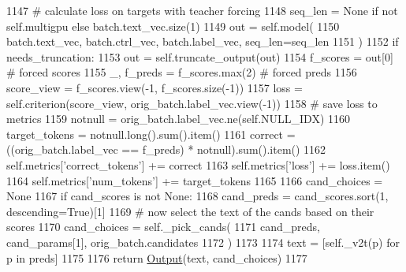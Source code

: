 \begin{DoxyCode}
1147             \textcolor{comment}{# calculate loss on targets with teacher forcing}
1148             seq\_len = \textcolor{keywordtype}{None} \textcolor{keywordflow}{if} \textcolor{keywordflow}{not} self.multigpu \textcolor{keywordflow}{else} batch.text\_vec.size(1)
1149             out = self.model(
1150                 batch.text\_vec, batch.ctrl\_vec, batch.label\_vec, seq\_len=seq\_len
1151             )
1152             \textcolor{keywordflow}{if} needs\_truncation:
1153                 out = self.truncate\_output(out)
1154             f\_scores = out[0]  \textcolor{comment}{# forced scores}
1155             \_, f\_preds = f\_scores.max(2)  \textcolor{comment}{# forced preds}
1156             score\_view = f\_scores.view(-1, f\_scores.size(-1))
1157             loss = self.criterion(score\_view, orig\_batch.label\_vec.view(-1))
1158             \textcolor{comment}{# save loss to metrics}
1159             notnull = orig\_batch.label\_vec.ne(self.NULL\_IDX)
1160             target\_tokens = notnull.long().sum().item()
1161             correct = ((orig\_batch.label\_vec == f\_preds) * notnull).sum().item()
1162             self.metrics[\textcolor{stringliteral}{'correct\_tokens'}] += correct
1163             self.metrics[\textcolor{stringliteral}{'loss'}] += loss.item()
1164             self.metrics[\textcolor{stringliteral}{'num\_tokens'}] += target\_tokens
1165 
1166         cand\_choices = \textcolor{keywordtype}{None}
1167         \textcolor{keywordflow}{if} cand\_scores \textcolor{keywordflow}{is} \textcolor{keywordflow}{not} \textcolor{keywordtype}{None}:
1168             cand\_preds = cand\_scores.sort(1, descending=\textcolor{keyword}{True})[1]
1169             \textcolor{comment}{# now select the text of the cands based on their scores}
1170             cand\_choices = self.\_pick\_cands(
1171                 cand\_preds, cand\_params[1], orig\_batch.candidates
1172             )
1173 
1174         text = [self.\_v2t(p) \textcolor{keywordflow}{for} p \textcolor{keywordflow}{in} preds]
1175 
1176         \textcolor{keywordflow}{return} \hyperlink{namespaceparlai_1_1agents_1_1legacy__agents_1_1seq2seq_1_1torch__agent__v1_a2689006ea97d09413fb242f984bd8016}{Output}(text, cand\_choices)
1177 
\end{DoxyCode}
\mbox{\label{classprojects_1_1controllable__dialogue_1_1controllable__seq2seq_1_1controllable__seq2seq_1_1ControllableSeq2seqAgent_a836e91446f995a74cce113051991711a}} 
